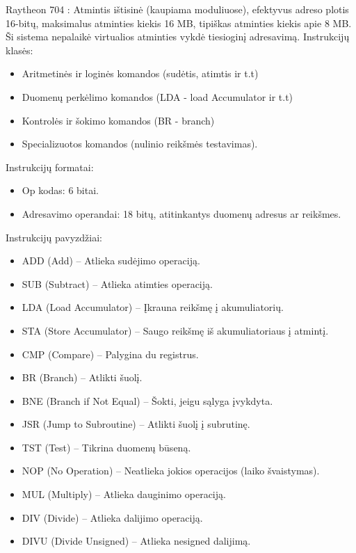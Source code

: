 \documentclass{article}
\begin{document}
Raytheon 704 : Atmintis ištisinė (kaupiama moduliuose), efektyvus adreso plotis 16-bitų, maksimalus atminties kiekis 16 MB, tipiškas atminties kiekis apie 8 MB. Ši sistema nepalaikė virtualios atminties vykdė tiesioginį adresavimą.
Instrukcijų klasės:
\begin{itemize}
    \item Aritmetinės ir loginės komandos (sudėtis, atimtis ir t.t)
     \item Duomenų perkėlimo komandos (LDA - load Accumulator ir t.t)
    \item Kontrolės ir šokimo komandos (BR - branch)
    \item Specializuotos komandos (nulinio reikšmės testavimas).
\end{itemize}
Instrukcijų formatai:
\begin{itemize}
    \item Op kodas: 6 bitai.
    \item Adresavimo operandai: 18 bitų, atitinkantys duomenų adresus ar reikšmes.
\end{itemize}
Instrukcijų pavyzdžiai:
\begin{itemize}
    \item ADD (Add) – Atlieka sudėjimo operaciją.
    \item SUB (Subtract) – Atlieka atimties operaciją.
    \item LDA (Load Accumulator) – Įkrauna reikšmę į akumuliatorių.
    \item STA (Store Accumulator) – Saugo reikšmę iš akumuliatoriaus į atmintį.
    \item CMP (Compare) – Palygina du registrus.
    \item BR (Branch) – Atlikti šuolį.
    \item BNE (Branch if Not Equal) – Šokti, jeigu sąlyga įvykdyta.
    \item JSR (Jump to Subroutine) – Atlikti šuolį į subrutinę.
    \item TST (Test) – Tikrina duomenų būseną.
    \item NOP (No Operation) – Neatlieka jokios operacijos (laiko švaistymas).
    \item MUL (Multiply) – Atlieka dauginimo operaciją.
    \item DIV (Divide) – Atlieka dalijimo operaciją.
    \item DIVU (Divide Unsigned) – Atlieka nesigned dalijimą.
\end{itemize}
\end{document}
